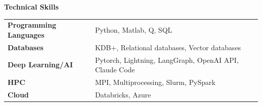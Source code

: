 \documentclass{article}
\begin{document}
\vspace{0.25in}
\newpage

{\Large\bf Technical Skills} \hrulefill \\

\begin{tabular}{p{1.8in}p{6in}}
    {\bf Programming Languages}&Python, Matlab, Q, SQL\\
    {\bf Databases}&KDB+, Relational databases, Vector databases\\
    {\bf Deep Learning/AI}&Pytorch, Lightning, LangGraph, OpenAI API, Claude Code\\
    {\bf HPC}&MPI, Multiprocessing, Slurm, PySpark\\
    {\bf Cloud}&Databricks, Azure
\end{tabular}
\end{document}

